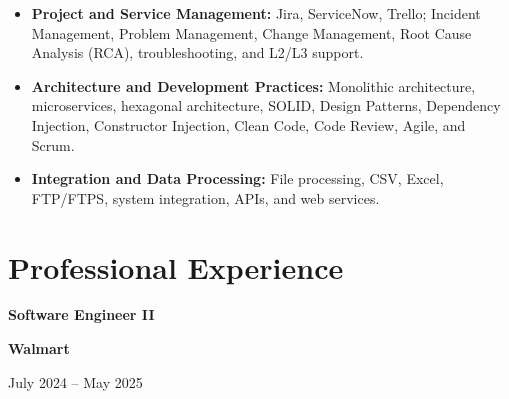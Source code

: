 \documentclass[10pt,letterpaper]{article}
\newcommand{\jobtitle}[1]{
    {\bfseries #1}
}
\newcommand{\company}[1]{
    {\bfseries\color{DarkGray} #1}
}
\newcommand{\jobdate}[1]{
    {\color{MediumGray} #1}
}
\begin{document}
\begin{itemize}
    \item \textbf{Project and Service Management:}
    Jira, ServiceNow, Trello;
    Incident Management, Problem Management, Change Management,
    Root Cause Analysis (RCA), troubleshooting, and L2/L3 support.

    \item \textbf{Architecture and Development Practices:}
    Monolithic architecture, microservices, hexagonal architecture,
    SOLID, Design Patterns, Dependency Injection, Constructor Injection,
    Clean Code, Code Review, Agile, and Scrum.

    \item \textbf{Integration and Data Processing:}
    File processing, CSV, Excel, FTP/FTPS,
    system integration, APIs, and web services.

\end{itemize}


\section{Professional Experience}


\jobtitle{Software Engineer II} \textbar{}
\company{Walmart}
\hfill \textbar{}
\jobdate{July 2024 -- May 2025}
\end{document}
